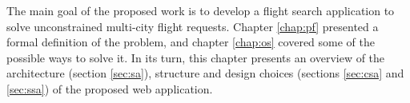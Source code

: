 The main goal of the proposed work is to develop a flight search application to solve unconstrained multi-city flight requests. Chapter \ref{chap:pf} presented a formal definition of the problem, and chapter \ref{chap:os} covered some of the possible ways to solve it. In its turn, this chapter presents an overview of the architecture (section \ref{sec:sa}), structure and design choices (sections \ref{sec:csa} and \ref{sec:ssa}) of the proposed web application.